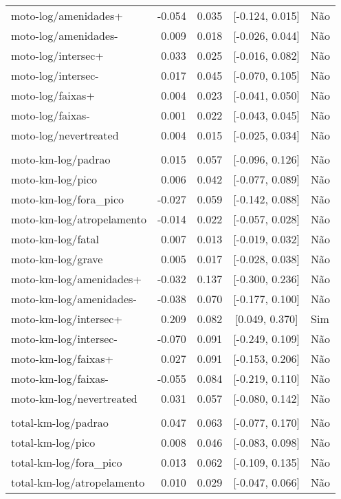 \begin{longtable}{lrrcl}
moto-log/amenidades+ & -0.054 & 0.035 & {}[-0.124, 0.015] & Não\\
moto-log/amenidades- & 0.009 & 0.018 & {}[-0.026, 0.044] & Não\\
moto-log/intersec+ & 0.033 & 0.025 & {}[-0.016, 0.082] & Não\\
moto-log/intersec- & 0.017 & 0.045 & {}[-0.070, 0.105] & Não\\
moto-log/faixas+ & 0.004 & 0.023 & {}[-0.041, 0.050] & Não\\
moto-log/faixas- & 0.001 & 0.022 & {}[-0.043, 0.045] & Não\\
moto-log/nevertreated & 0.004 & 0.015 & {}[-0.025, 0.034] & Não\\
 &  &  &  & \\
moto-km-log/padrao & 0.015 & 0.057 & {}[-0.096, 0.126] & Não\\
moto-km-log/pico & 0.006 & 0.042 & {}[-0.077, 0.089] & Não\\
moto-km-log/fora\_pico & -0.027 & 0.059 & {}[-0.142, 0.088] & Não\\
moto-km-log/atropelamento & -0.014 & 0.022 & {}[-0.057, 0.028] & Não\\
moto-km-log/fatal & 0.007 & 0.013 & {}[-0.019, 0.032] & Não\\
moto-km-log/grave & 0.005 & 0.017 & {}[-0.028, 0.038] & Não\\
moto-km-log/amenidades+ & -0.032 & 0.137 & {}[-0.300, 0.236] & Não\\
moto-km-log/amenidades- & -0.038 & 0.070 & {}[-0.177, 0.100] & Não\\
moto-km-log/intersec+ & 0.209 & 0.082 & {}[0.049, 0.370] & Sim\\
moto-km-log/intersec- & -0.070 & 0.091 & {}[-0.249, 0.109] & Não\\
moto-km-log/faixas+ & 0.027 & 0.091 & {}[-0.153, 0.206] & Não\\
moto-km-log/faixas- & -0.055 & 0.084 & {}[-0.219, 0.110] & Não\\
moto-km-log/nevertreated & 0.031 & 0.057 & {}[-0.080, 0.142] & Não\\
 &  &  &  & \\
total-km-log/padrao & 0.047 & 0.063 & {}[-0.077, 0.170] & Não\\
total-km-log/pico & 0.008 & 0.046 & {}[-0.083, 0.098] & Não\\
total-km-log/fora\_pico & 0.013 & 0.062 & {}[-0.109, 0.135] & Não\\
total-km-log/atropelamento & 0.010 & 0.029 & {}[-0.047, 0.066] & Não\\

\end{longtable}
